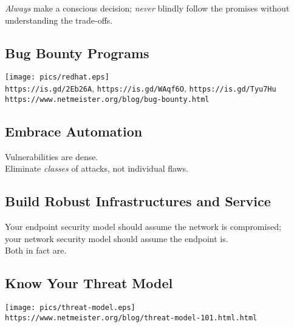 \documentclass[xga]{xdvislides}
\begin{document}
\addvspace{.25in}
{\em Always} make a conscious decision; {\em never} blindly follow
the promises without understanding the trade-offs.

\subsection{Bug Bounty Programs}
\vspace*{\fill}
\begin{center}
	\texttt{[image: pics/redhat.eps]} \\
	\vspace{.25in}
	\verb+https://is.gd/2Eb26A+, \verb+https://is.gd/WAqf6O+, \verb+https://is.gd/Tyu7Hu+ \\
	\vspace{.125in}
\verb+https://www.netmeister.org/blog/bug-bounty.html+
\end{center}
\vspace*{\fill}

\subsection{Embrace Automation}
\vspace*{\fill}
\Huge
\begin{center}
	Vulnerabilities are dense. \\
\addvspace{.5in}
	Eliminate {\em classes} of attacks, not
	individual flaws. \\
\end{center}
\Normalsize
\vspace*{\fill}

\subsection{Build Robust Infrastructures and Service}
\vspace*{\fill}
\Huge
\begin{center}
	Your endpoint security model should assume the
	network is compromised; \\
	your network security model should assume the
	endpoint is. \\
\addvspace{.5in}
	Both in fact are.
\end{center}
\Normalsize
\vspace*{\fill}

\subsection{Know Your Threat Model}
\vspace*{\fill}
\begin{center}
	\texttt{[image: pics/threat-model.eps]} \\
\vspace{.2in}
\small
	\verb+https://www.netmeister.org/blog/threat-model-101.html.html+
\end{center}
\Normalsize
\vspace*{\fill}
\end{document}
